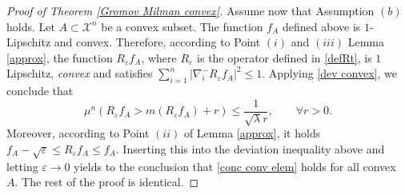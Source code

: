 \documentclass[11pt]{amsart}
\numberwithin{equation}{section}
\begin{document}
\begin{proof}[Proof of Theorem \ref{Gromov Milman convex}]
Assume now that Assumption $(b)$ holds. Let $A\subset {\mathcal{X}}^n$ be a convex subset. The function $f_A$ defined above is $1$-Lipschitz and convex. Therefore, according to Point $(i)$ and $(iii)$ Lemma \ref{approx}, the function $R_\varepsilon f_A$, where $R_\varepsilon$ is the operator defined in \eqref{defRt}, is $1$ Lipschitz, \emph{convex} and satisfies $\sum_{i=1}^n|\nabla_i^{-}R_\varepsilon f_A|^2\leq 1$. Applying \eqref{dev convex}, we conclude that
\[
\mu^n\left(R_\varepsilon f_A>m(R_\varepsilon f_A)+r\right)\leq \frac{1}{\sqrt{\lambda}r},\qquad \forall r>0.
\]
Moreover, according to Point $(ii)$ of Lemma \ref{approx}, it holds $f_A-\sqrt{\varepsilon}\leq R_\varepsilon f_A\leq f_A$. Inserting this into the deviation inequality above and letting $\varepsilon\to 0$ yields to the conclusion that \eqref{conc conv elem} holds for all convex $A.$ The rest of the proof is identical.\end{proof}
\end{document}
